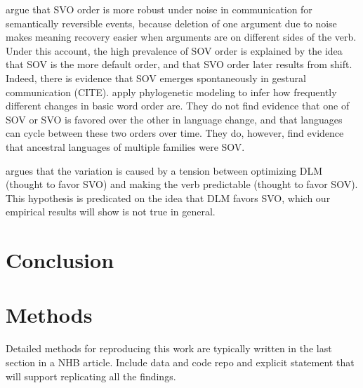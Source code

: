 \documentclass[11pt,a4paper]{article}
\begin{document}
\cite{gibson-noisy-channel-2013} argue that SVO order is more robust under noise in communication for semantically reversible events, because deletion of one argument due to noise makes meaning recovery easier when arguments are on different sides of the verb.
Under this account, the high prevalence of SOV order is explained by the idea that SOV is the more default order, and that SVO order later results from shift.
Indeed, there is evidence that SOV emerges spontaneously in gestural communication (CITE).
\cite{maurits2014tracing} apply phylogenetic modeling to infer how frequently different changes in basic word order are.
They do not find evidence that one of SOV or SVO is favored over the other in language change, and that languages can cycle between these two orders over time.
They do, however, find evidence that ancestral languages of multiple families were SOV.

\cite{ferrer-i-cancho-placement-2017} argues that the variation is caused by a tension between optimizing DLM (thought to favor SVO) and making the verb predictable (thought to favor SOV). This hypothesis is predicated on the idea that DLM favors SVO, which our empirical results will show is not true in general.


\section{Conclusion}

\section*{Methods}

{\color{blue}Detailed methods for reproducing this work are typically written in the last section in a NHB article. Include data and code repo and explicit statement that will support replicating all the findings.}\\
\end{document}
